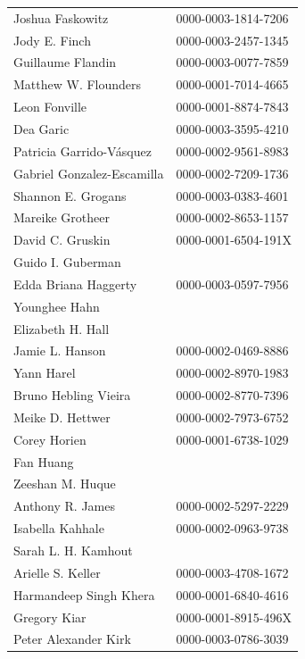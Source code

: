 \documentclass[fleqn,10pt,inline]{wlscirep}
\begin{document}
\begin{appendixbox}
\begin{longtable}{ll}
          Joshua Faskowitz & 0000-0003-1814-7206 \\
             Jody E. Finch & 0000-0003-2457-1345 \\
         Guillaume Flandin & 0000-0003-0077-7859 \\
      Matthew W. Flounders & 0000-0001-7014-4665 \\
             Leon Fonville & 0000-0001-8874-7843 \\
                 Dea Garic & 0000-0003-3595-4210 \\
  Patricia Garrido-Vásquez & 0000-0002-9561-8983 \\
Gabriel Gonzalez-Escamilla & 0000-0002-7209-1736 \\
        Shannon E. Grogans & 0000-0003-0383-4601 \\
          Mareike Grotheer & 0000-0002-8653-1157 \\
          David C. Gruskin & 0000-0001-6504-191X \\
         Guido I. Guberman &                     \\
      Edda Briana Haggerty & 0000-0003-0597-7956 \\
             Younghee Hahn &                     \\
         Elizabeth H. Hall &                     \\
           Jamie L. Hanson & 0000-0002-0469-8886 \\
                Yann Harel & 0000-0002-8970-1983 \\
      Bruno Hebling Vieira & 0000-0002-8770-7396 \\
          Meike D. Hettwer & 0000-0002-7973-6752 \\
              Corey Horien & 0000-0001-6738-1029 \\
                 Fan Huang &                     \\
          Zeeshan M. Huque &                     \\
          Anthony R. James & 0000-0002-5297-2229 \\
          Isabella Kahhale & 0000-0002-0963-9738 \\
       Sarah L. H. Kamhout &                     \\
         Arielle S. Keller & 0000-0003-4708-1672 \\
    Harmandeep Singh Khera & 0000-0001-6840-4616 \\
              Gregory Kiar & 0000-0001-8915-496X \\
      Peter Alexander Kirk & 0000-0003-0786-3039 \\

\end{longtable}
\end{appendixbox}
\end{document}
